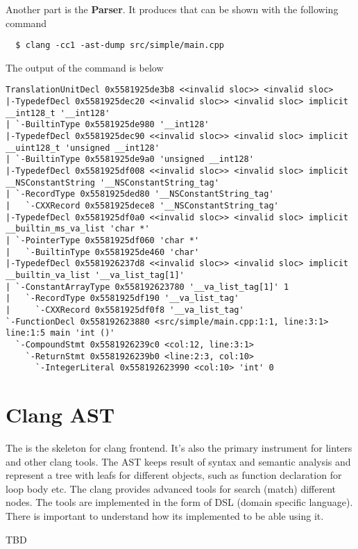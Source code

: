 Another part is the \textbf{Parser}. It produces  that
can be shown with the following command
\begin{verbatim}
  $ clang -cc1 -ast-dump src/simple/main.cpp
  \end{verbatim}
The output of the command is below
\begin{verbatim}
TranslationUnitDecl 0x5581925de3b8 <<invalid sloc>> <invalid sloc>
|-TypedefDecl 0x5581925dec20 <<invalid sloc>> <invalid sloc> implicit __int128_t '__int128'
| `-BuiltinType 0x5581925de980 '__int128'
|-TypedefDecl 0x5581925dec90 <<invalid sloc>> <invalid sloc> implicit __uint128_t 'unsigned __int128'
| `-BuiltinType 0x5581925de9a0 'unsigned __int128'
|-TypedefDecl 0x5581925df008 <<invalid sloc>> <invalid sloc> implicit __NSConstantString '__NSConstantString_tag'
| `-RecordType 0x5581925ded80 '__NSConstantString_tag'
|   `-CXXRecord 0x5581925dece8 '__NSConstantString_tag'
|-TypedefDecl 0x5581925df0a0 <<invalid sloc>> <invalid sloc> implicit __builtin_ms_va_list 'char *'
| `-PointerType 0x5581925df060 'char *'
|   `-BuiltinType 0x5581925de460 'char'
|-TypedefDecl 0x5581926237d8 <<invalid sloc>> <invalid sloc> implicit __builtin_va_list '__va_list_tag[1]'
| `-ConstantArrayType 0x558192623780 '__va_list_tag[1]' 1
|   `-RecordType 0x5581925df190 '__va_list_tag'
|     `-CXXRecord 0x5581925df0f8 '__va_list_tag'
`-FunctionDecl 0x558192623880 <src/simple/main.cpp:1:1, line:3:1> line:1:5 main 'int ()'
  `-CompoundStmt 0x5581926239c0 <col:12, line:3:1>
    `-ReturnStmt 0x5581926239b0 <line:2:3, col:10>
      `-IntegerLiteral 0x558192623990 <col:10> 'int' 0
\end{verbatim}

\section{Clang AST}
The  is the skeleton for clang frontend. It's also the primary
instrument for linters and other clang tools. The AST keeps result of syntax and
semantic analysis and represent a tree with leafs for different objects, such as
function declaration for loop body etc. The clang provides advanced tools for
search (match) different nodes. The tools are implemented in the form of DSL
(domain specific language). There is important to understand how its
implemented to be able using it.

TBD
